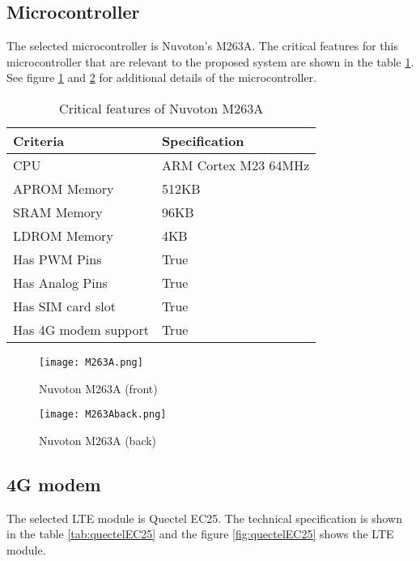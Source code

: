 \documentclass[../thesis.tex]{subfiles}
\begin{document}
\subsection{Microcontroller}

The selected microcontroller is Nuvoton's M263A. The critical features for this microcontroller that are relevant to the proposed system are shown in the table \ref{tab:microcontrollerSpecification}. See figure \ref{fig:m263A} and \ref{fig:m263Aback} for additional details of the microcontroller.

\begin{table}[h!]
\begin{center}
\caption{Critical features of Nuvoton M263A}
\label{tab:microcontrollerSpecification}
\begin{tabular}{l|l}
\toprule
\textbf{Criteria} & \textbf{Specification}\\
\midrule
CPU & ARM Cortex M23 64MHz\\
APROM Memory & 512KB\\
SRAM Memory & 96KB\\
LDROM Memory & 4KB\\
Has PWM Pins & True\\
Has Analog Pins & True\\
Has SIM card slot & True\\
Has 4G modem support & True\\
\bottomrule
\end{tabular}
\end{center}
\end{table}

\begin{figure}[!ht]
\texttt{[image: M263A.png]}
\caption{Nuvoton M263A (front) \cite{Nuvoton}}
\label{fig:m263A}
\end{figure}

\begin{figure}[!ht]
\texttt{[image: M263Aback.png]}
\caption{Nuvoton M263A (back) \cite{Nuvoton}}
\label{fig:m263Aback}
\end{figure}

\subsection{4G modem}

The selected LTE module is Quectel EC25. The technical specification is shown in the table \ref{tab:quectelEC25} and the figure \ref{fig:quectelEC25} shows the LTE module.
\end{document}
